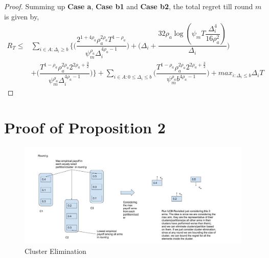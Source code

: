 \begin{proof}
 
Summing up \textbf{Case a}, \textbf{Case b1} and \textbf{Case b2}, the total regret till round $m$ is given by,
\begin{align*}
 R_{T} \leq &\sum\limits_{i\in A:\Delta_{i}\geq b}\bigg\lbrace\bigg(\dfrac{2^{1+4\rho_{a}}\rho_{a}^{2\rho_{a}}T^{1-\rho_{a}}}{\psi_{m}^{\rho_{a}}\Delta_{i}^{4\rho_{a}-1}}\bigg) + \bigg(\Delta_{i}+\dfrac{32\rho_{a}\log{(\psi_{m}T\dfrac{\Delta_{i}^{4}}{16\rho_{a}^{2}})}}{\Delta_{i}}\bigg)\\
&  +  \bigg(\dfrac{T^{1-\rho_{a}}\rho_{a}^{2\rho_{a}}2^{2\rho_{a}+\frac{3}{2}}}{\psi_{m}^{\rho_{a}}\Delta_{i}^{4\rho_{a} -1}} \bigg) \bigg \rbrace+\sum\limits_{i\in A:0\leq\Delta_{i}\leq b}\bigg(\dfrac{T^{1-\rho_{a}}\rho_{a}^{2\rho_{a}}2^{2\rho_{a}+\frac{3}{2}}}{\psi_{m}^{\rho_{a}}b^{4\rho_{a} -1}} \bigg) + max_{i:\Delta_{i}\leq b}\Delta_{i}T
\end{align*}
  
\end{proof}

\section{Proof of Proposition 2}
\label{App:B}

\begin{figure}
\includegraphics[scale=0.3]{img/diagCluster.jpg}
\caption{Cluster Elimination}
\label{Fig:ClusFig}
\end{figure}


